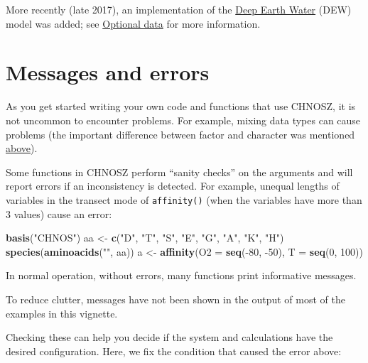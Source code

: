 \documentclass[]{tufte-handout}
\newenvironment{Shaded}{}{}
\newcommand{\KeywordTok}[1]{\textcolor[rgb]{0.00,0.44,0.13}{\textbf{#1}}}
\newcommand{\DataTypeTok}[1]{\textcolor[rgb]{0.56,0.13,0.00}{#1}}
\newcommand{\DecValTok}[1]{\textcolor[rgb]{0.25,0.63,0.44}{#1}}
\newcommand{\StringTok}[1]{\textcolor[rgb]{0.25,0.44,0.63}{#1}}
\newcommand{\OperatorTok}[1]{\textcolor[rgb]{0.40,0.40,0.40}{#1}}
\newcommand{\NormalTok}[1]{#1}
\begin{document}
More recently (late 2017), an implementation of the
\href{http://www.dewcommunity.org/}{Deep Earth Water} (DEW) model was
added; see \protect\hyperlink{optional-data}{Optional data} for more
information.

\section{Messages and errors}\label{messages-and-errors}

As you get started writing your own code and functions that use CHNOSZ,
it is not uncommon to encounter problems. For example, mixing data types
can cause problems (the important difference between factor and
character was mentioned \protect\hyperlink{adding-data}{above}).

Some functions in CHNOSZ perform ``sanity checks'' on the arguments and
will report errors if an inconsistency is detected. For example, unequal
lengths of variables in the transect mode of {\texttt{affinity()}} (when
the variables have more than 3 values) cause an error:

\begin{Shaded}
\begin{Highlighting}[]
\KeywordTok{basis}\NormalTok{(}\StringTok{"CHNOS"}\NormalTok{)}
\NormalTok{aa <-}\StringTok{ }\KeywordTok{c}\NormalTok{(}\StringTok{"D"}\NormalTok{, }\StringTok{"T"}\NormalTok{, }\StringTok{"S"}\NormalTok{, }\StringTok{"E"}\NormalTok{, }\StringTok{"G"}\NormalTok{, }\StringTok{"A"}\NormalTok{, }\StringTok{"K"}\NormalTok{, }\StringTok{"H"}\NormalTok{)}
\KeywordTok{species}\NormalTok{(}\KeywordTok{aminoacids}\NormalTok{(}\StringTok{""}\NormalTok{, aa))}
\NormalTok{a <-}\StringTok{ }\KeywordTok{affinity}\NormalTok{(}\DataTypeTok{O2 =} \KeywordTok{seq}\NormalTok{(}\OperatorTok{-}\DecValTok{80}\NormalTok{, }\OperatorTok{-}\DecValTok{50}\NormalTok{), }\DataTypeTok{T =} \KeywordTok{seq}\NormalTok{(}\DecValTok{0}\NormalTok{, }\DecValTok{100}\NormalTok{))}
\end{Highlighting}
\end{Shaded}

In normal operation, without errors, many functions print informative
messages.

\begin{marginfigure}
To reduce clutter, messages have not been shown in the output of most of
the examples in this vignette.
\end{marginfigure}

Checking these can help you decide if the system and calculations have
the desired configuration. Here, we fix the condition that caused the
error above:
\end{document}
